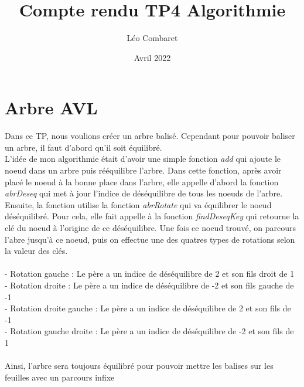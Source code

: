 \documentclass[a4paper]{article}
\title{Compte rendu TP4 Algorithmie}
\author{Léo Combaret}
\date{Avril 2022}
\begin{document}
\renewcommand{\arraystretch}{1.5}
\newcommand{\HRule}{\rule{\linewidth}{0.5mm}}
\maketitle

\section{Arbre AVL}

Dans ce TP, nous voulions créer un arbre balisé.
Cependant pour pouvoir baliser un arbre, il faut d'abord qu'il soit équilibré.\\

L'idée de mon algorithmie était d'avoir une simple fonction \emph{add} qui ajoute le noeud dans un arbre puis rééquilibre l'arbre.
Dans cette fonction, après avoir placé le noeud à la bonne place dans l'arbre, elle appelle d'abord la fonction \emph{abrDeseq} qui 
met à jour l'indice de déséquilibre de tous les noeuds de l'arbre. \\

Ensuite, la fonction utilise la fonction \emph{abrRotate} qui va équilibrer le noeud déséquilibré.
Pour cela, elle fait appelle à la fonction \emph{findDeseqKey} qui retourne la clé du noeud à l'origine de ce déséquilibre.
Une fois ce noeud trouvé, on parcours l'abre jusqu'à ce noeud, puis on effectue une des quatres types de rotations selon la valeur des clés.\\\\
 - Rotation gauche : Le père a un indice de déséquilibre de 2 et son fils droit de 1\\
 - Rotation droite : Le père a un indice de déséquilibre de -2 et son fils gauche de -1\\
 - Rotation droite gauche : Le père a un indice de déséquilibre de 2 et son fils de -1\\
 - Rotation gauche droite :  Le père a un indice de déséquilibre de -2 et son fils de 1\\\\
Ainsi, l'arbre sera toujours équilibré pour pouvoir mettre les balises sur les feuilles avec un parcours infixe

 
\end{document}
